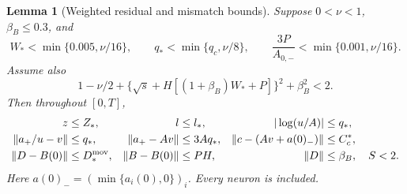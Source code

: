 \documentclass[10pt]{article}
\newtheorem{lemma}[theorem]{Lemma}
\theoremstyle{remark}\newtheorem{remark}[theorem]{Remark}
\begin{document}
\begin{lemma}[Weighted residual and mismatch bounds]
\label{sbsharp:weighted}\label{sbwide:relative}
Suppose $0<\nu<1$, $\beta_B\le0.3$, and
\[
 W_*<\min\{0.005,\nu/16\},\qquad
 q_*<\min\{q_c,\nu/8\},\qquad
 \frac{3P}{A_{0,-}}<\min\{0.001,\nu/16\}.
\]
Assume also
\[
 1-\nu/2+\{\sqrt s+H[(1+\beta_B)W_*+P]\}^2+\beta_B^2<2.
\]
Then throughout $[0,T]$,
\begin{align}\label{sbwide:relative-bounds}
 z&\le Z_*,& l&\le l_*,& |\log(u/A)|&\le q_*,\\
 \|a_+/u-v\|&\le q_*,&\|a_+-Av\|&\le3Aq_*,&
 \|c-(Av+a(0)_-)\|&\le C_c^*,\nonumber\\
 \|D-B(0)\|&\le D_*^{\rm mov},&\|B-B(0)\|&\le PH,&
 \|D\|&\le\beta_B,\quad S<2.\nonumber
\end{align}
Here $a(0)_-=(\min\{a_i(0),0\})_i$.
Every neuron is included.
\end{lemma}
\end{document}

